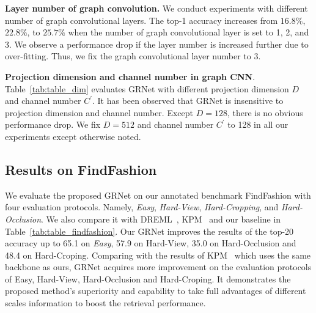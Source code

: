 \documentclass[10pt,twocolumn,letterpaper]{article}
\begin{document}
\textbf{Layer number of graph convolution.} We conduct experiments  with different number of graph convolutional layers. The top-1 accuracy increases from $16.8\%$, $22.8\%$, to $25.7\%$ when the number of graph convolutional layer is set to 1, 2, and 3. We observe a performance drop if the layer number is increased further due to over-fitting.
Thus, we fix the graph convolutional layer number to 3.





\textbf{Projection dimension and channel number in graph CNN}. Table~\ref{tab:table_dim} evaluates GRNet with different projection dimension $D$ and channel number $C^{'}$. It has been observed that GRNet is insensitive to projection dimension and channel number. Except
$D=128$, there is no obvious performance drop.  We fix $D=512$ and channel number $C^{'}$ to 128 in all our experiments except otherwise noted.

\subsection{Results on FindFashion}
We evaluate the proposed GRNet on our annotated benchmark FindFashion with four evaluation protocols. Namely, \textit{Easy}, \textit{Hard-View}, \textit{Hard-Cropping}, and \textit{Hard-Occlusion}. We also compare it with DREML~\cite{Xuan2018}, KPM~\cite{Shen_2018_CVPR} and our baseline in Table~\ref{tab:table_findfashion}.
Our GRNet improves the results of the top-20 accuracy up to 65.1 on \textit{Easy}, 57.9 on Hard-View, 35.0 on Hard-Occlusion and 48.4 on Hard-Croping.
Comparing with the results of KPM~\cite{Shen_2018_CVPR} which uses the same backbone as ours, GRNet acquires more improvement on the evaluation protocols of Easy, Hard-View, Hard-Occlusion and  Hard-Croping.
It demonstrates the proposed method's superiority and capability to take full advantages of different scales information to boost the retrieval performance.
\end{document}
